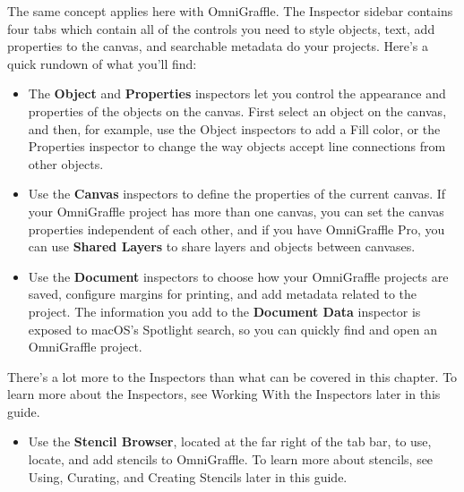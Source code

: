 \documentclass[../main.tex]{subfiles}
\begin{document}
The same concept applies here with OmniGraffle. The Inspector sidebar contains four tabs which
contain all of
the controls you need to style objects, text, add properties to the canvas, and searchable
metadata do your
projects. Here's a quick rundown of what you'll find:
\begin{itemize}
  \item The \textbf{Object} and \textbf{Properties} inspectors let you control the appearance
    and properties
    of the objects on the canvas. First select an object on the canvas, and then, for example,
    use the Object
    inspectors to add a Fill color, or the Properties inspector to change the way objects accept
    line
    connections from other objects.
  \item Use the \textbf{Canvas} inspectors to define the properties of the current canvas. If
    your
    OmniGraffle project has more than one canvas, you can set the canvas properties independent
    of each
    other, and if you have OmniGraffle Pro, you can use \textbf{Shared Layers} to share layers
    and objects
    between canvases.
  \item Use the \textbf{Document} inspectors to choose how your OmniGraffle projects are saved,
    configure
    margins for printing, and add metadata related to the project. The information you add to
    the
    \textbf{Document Data} inspector is exposed to macOS's Spotlight search, so you can quickly
    find and open
    an OmniGraffle project.
\end{itemize}
There's a lot more to the Inspectors than what can be covered in this chapter. To learn more
about the
Inspectors, see Working With the Inspectors later in this guide.
\begin{itemize}
  \item Use the \textbf{Stencil Browser}, located at the far right of the tab bar, to use,
    locate, and add
    stencils to OmniGraffle. To learn more about stencils, see Using, Curating, and Creating
    Stencils later
    in this guide.
\end{itemize}

\end{document}
